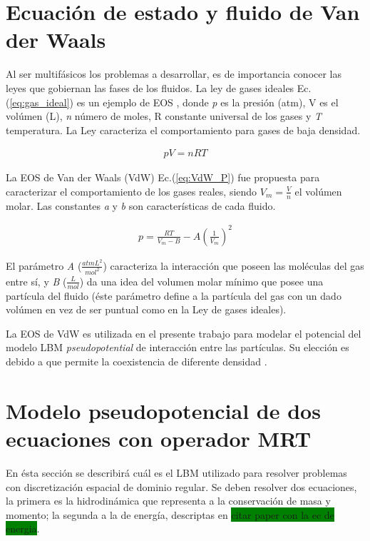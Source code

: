 \section{Ecuación de estado y fluido de Van der Waals}

Al ser multifásicos los problemas a desarrollar, es de importancia conocer las leyes que gobiernan las fases de los fluidos. La ley de gases ideales Ec. (\ref{eq:gas_ideal}) es un ejemplo de EOS , donde \textit{p} es la presión (atm), V es el volúmen (L), \textit{n} número de moles, R constante universal de los gases y \textit{T} temperatura. La Ley caracteriza el comportamiento para gases de baja densidad.

\begin{align}
p V = n R T
\label{eq:gas_ideal}
\end{align}

La EOS de Van der Waals (VdW) Ec.(\ref{eq:VdW_P}) fue propuesta para caracterizar el comportamiento de los gases reales, siendo $V_m = \frac{V}{n}$ el volúmen molar. Las constantes \textit{a} y \textit{b} son características de cada fluido.

\begin{align}
p = \frac{R T}{V_m - B} - A {(\frac{1}{V_m})}^2
\label{eq:VdW_P}
\end{align}

El parámetro \textit{A}  ($\frac{atm L^2}{mol^2}$) caracteriza la interacción que poseen las moléculas del gas entre sí, y \textit{B} ($\frac{L}{mol}$) da una idea del volumen molar mínimo que posee una partícula del fluido (éste parámetro define a la partícula del gas con un dado volúmen en vez de ser puntual como en la Ley de gases ideales).

La EOS de VdW es utilizada en el presente trabajo para modelar el potencial del modelo LBM \textit{pseudopotential} de interacción entre las partículas. Su elección es debido a que permite la coexistencia de diferente densidad \cite{huang2015multiphase}. 


\section{Modelo pseudopotencial de dos ecuaciones con operador MRT}
\label{sec:LBM_2_ec_MRT}

En ésta sección se describirá cuál es el LBM utilizado para resolver problemas con discretización espacial de dominio regular. Se deben resolver dos ecuaciones, la primera es la hidrodinámica que representa a la conservación de masa y momento; la segunda a la de energía, descriptas en \colorbox{green}{citar paper con la ec de energia}.


